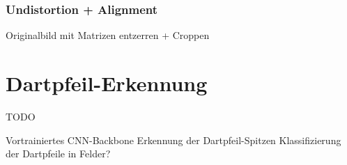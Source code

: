 \subsubsection{Undistortion + Alignment}
\label{sec:impl:cv:orient:undistort}
Originalbild mit Matrizen entzerren + Croppen


\section{Dartpfeil-Erkennung}
\label{sec:impl:ki}

TODO

Vortrainiertes CNN-Backbone
Erkennung der Dartpfeil-Spitzen
Klassifizierung der Dartpfeile in Felder?
